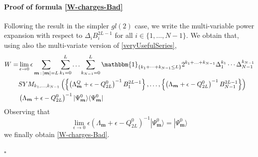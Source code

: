 \documentclass[10pt]{article}
\numberwithin{equation}{section}
\numberwithin{equation}{subsection}
\begin{document}
\paragraph{Proof of formula \eqref{W-charges-Bad}}
Following the result in the simpler $gl(2)$ case, we write the multi-variable power expansion with respect to $\Delta_{i} B_{i}^{2L-1}$ for all $i\in\{1,\ldots,N-1\}$. We obtain that, using also the multi-variate version of \eqref{veryUsefulSeries},
\begin{equation}
	\begin{split}
		W=&\lim_{\epsilon\to 0}\epsilon\sum_{\bm{m}\,:\,|\bm{m}|=L}\sum_{k_{1}=0}^{L}\ldots\sum_{k_{N-1}=0}^{L}\mathbbm{1}_{\{k_{1}+\cdots+k_{N-1}\leq L\}}2^{k_{1}+\ldots+k_{N-1}}\Delta_{1}^{k_{1}}\cdots\Delta_{N-1}^{k_{N-1}}\\&SYM_{k_{1},\ldots,k_{N-1}}\left(\left\{\left(\Lambda_{\bm{m}}^{Q}+\epsilon-Q_{2L}^{0}\right)^{-1}B_{1}^{2L-1}\right\},\ldots,\left\{\left(\Lambda_{\bm{m}}+\epsilon-Q_{2L}^{0}\right)^{-1}B_{N-1}^{2L-1}\right\}\right)
		\\&
		\left(\Lambda_{\bm{m}}+\epsilon-Q_{2L}^{0}\right)^{-1}|\Psi_{\bm{m}}^{0}\rangle \langle \Psi_{\bm{m}}^{0}|
	\end{split}
\end{equation} 
Observing that 
\begin{equation}
	\lim_{\epsilon\to 0}	\epsilon\left(\Lambda_{\bm{m}}+\epsilon-Q_{2L}^{0}\right)^{-1}|\Psi_{\bm{m}}^{0}\rangle=|\Psi_{\bm{m}}^{0}\rangle
\end{equation}
we finally obtain \eqref{W-charges-Bad}. 
\begin{flushright}
	$\square$
\end{flushright}
\end{document}
